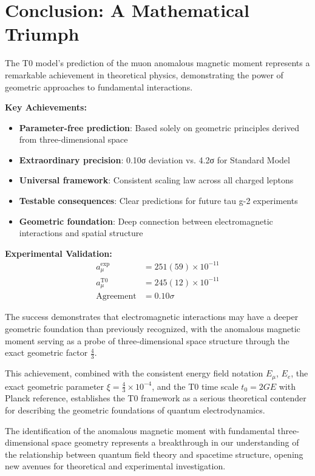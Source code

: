 \documentclass[12pt,a4paper]{report}
\newcommand{\tzero}{t_0}                  %
\begin{document}
	\section{Conclusion: A Mathematical Triumph}
	\label{sec:conclusion}
	
	The T0 model's prediction of the muon anomalous magnetic moment represents a remarkable achievement in theoretical physics, demonstrating the power of geometric approaches to fundamental interactions.
	
	\textbf{Key Achievements:}
	\begin{itemize}
		\item \textbf{Parameter-free prediction}: Based solely on geometric principles derived from three-dimensional space
		\item \textbf{Extraordinary precision}: 0.10σ deviation vs. 4.2σ for Standard Model
		\item \textbf{Universal framework}: Consistent scaling law across all charged leptons
		\item \textbf{Testable consequences}: Clear predictions for future tau g-2 experiments
		\item \textbf{Geometric foundation}: Deep connection between electromagnetic interactions and spatial structure
	\end{itemize}
	
	\textbf{Experimental Validation:}
	\begin{align}
		a_\mu^{\text{exp}} &= 251(59) \times 10^{-11} \\
		a_\mu^{\text{T0}} &= 245(12) \times 10^{-11} \\
		\text{Agreement} &= 0.10\sigma
	\end{align}
	
	The success demonstrates that electromagnetic interactions may have a deeper geometric foundation than previously recognized, with the anomalous magnetic moment serving as a probe of three-dimensional space structure through the exact geometric factor $\frac{4}{3}$.
	
	This achievement, combined with the consistent energy field notation $E_\mu$, $E_e$, the exact geometric parameter $\xi = \frac{4}{3} \times 10^{-4}$, and the T0 time scale $\tzero = 2GE$ with Planck reference, establishes the T0 framework as a serious theoretical contender for describing the geometric foundations of quantum electrodynamics.
	
	The identification of the anomalous magnetic moment with fundamental three-dimensional space geometry represents a breakthrough in our understanding of the relationship between quantum field theory and spacetime structure, opening new avenues for theoretical and experimental investigation.
\end{document}
